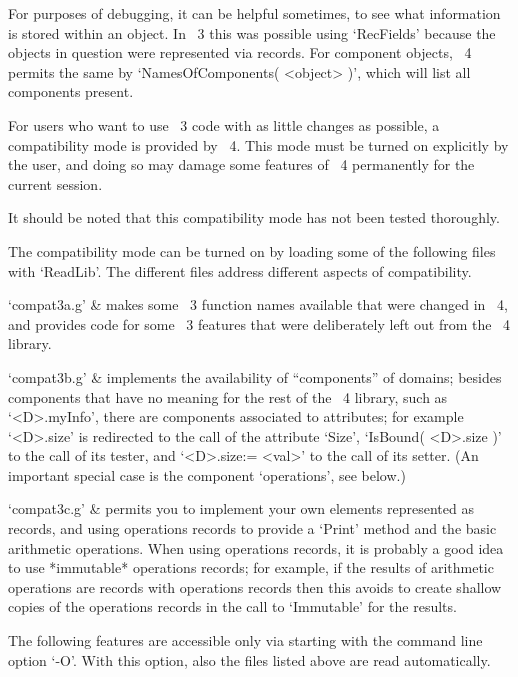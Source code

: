 For purposes of debugging, it can be helpful sometimes, to see what
information is stored within an object. In {\GAP}~3 this was possible using
`RecFields' because the objects in question were represented via records.
For component objects, {\GAP}~4 permits the same by
`NamesOfComponents( <object> )', which will list all components present.



For users who want to use {\GAP}~3 code with as little changes as
possible, a compatibility mode is provided by {\GAP}~4.
This mode must be turned on explicitly by the user,
and doing so may damage some features of {\GAP}~4 permanently
for the current session.

It should be noted that this compatibility mode has not been tested
thoroughly.

The compatibility mode can be turned on by loading some of the following
files with `ReadLib'.
The different files address different aspects of compatibility.

\beginitems
`compat3a.g' &
    makes some {\GAP}~3 function names available that were changed
    in {\GAP}~4,
    and provides code for some {\GAP}~3 features that were
    deliberately left out from the {\GAP}~4 library.

`compat3b.g' &
    implements the availability of ``components'' of domains;
    besides components that have no meaning for the rest of the {\GAP}~4
    library, such as `<D>.myInfo', there are components associated to
    attributes; for example `<D>.size' is redirected to the call of the
    attribute `Size', `IsBound( <D>.size )' to the call of its tester,
    and `<D>.size:= <val>' to the call of its setter.
    (An important special case is the component `operations', see below.)

`compat3c.g' &
    permits you to implement your own elements represented as records,
    and using operations records to provide a `Print' method and
    the basic arithmetic operations.
    When using operations records, it is probably a good idea to
    use *immutable* operations records; for example, if the results
    of arithmetic operations are records with operations records then
    this avoids to create shallow copies of the operations records 
    in the call to `Immutable' for the results.
\enditems

The following features are accessible only via starting {\GAP} with
the command line option `-O'.
With this option, also the files listed above are read automatically.

